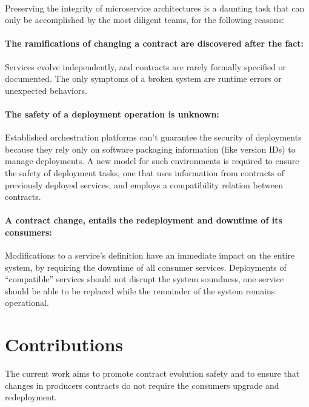 \paragraph{}

Preserving the integrity of microservice architectures is a daunting task that can only be accomplished by the most diligent teams, for the following reasons:

\paragraph{ The ramifications of changing a contract are discovered after the fact:}
Services evolve independently, and contracts are rarely formally specified or documented.
The only symptoms of a broken system are runtime errors or unexpected behaviors.

\paragraph{ The safety of a deployment operation is unknown:}
Established orchestration platforms can't guarantee the security of deployments because they rely only on software packaging information (like version IDs) to manage deployments.
A new model for such environments is required to ensure the safety of deployment tasks, one that uses information from contracts of previously deployed services,
 and employs a compatibility relation between contracts.

\paragraph{ A contract change, entails the redeployment and downtime of its consumers:}
Modifications to a service's definition have an immediate impact on the entire system, by requiring the downtime of all consumer services.
Deployments of “compatible” services should not disrupt the system soundness,
one service should be able to be replaced while the remainder of the system remains operational.

\section{Contributions} %
\label{sec:contributions}

The current  work  aims to promote contract evolution safety and to ensure that changes in producers contracts do not require the consumers upgrade and redeployment.

